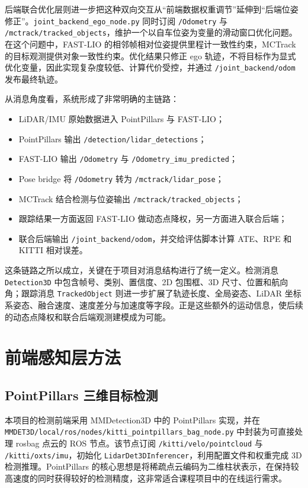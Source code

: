 \documentclass[UTF8,a4paper,12pt]{ctexart}
\begin{document}
后端联合优化层则进一步把这种双向交互从“前端数据权重调节”延伸到“后端位姿修正”。\texttt{joint\_backend\_ego\_node.py} 同时订阅 \texttt{/Odometry} 与 \texttt{/mctrack/tracked\_objects}，维护一个以自车位姿为变量的滑动窗口优化问题。在这个问题中，FAST-LIO 的相邻帧相对位姿提供里程计一致性约束，MCTrack 的目标观测提供对象一致性约束。优化结果只修正 ego 轨迹，不将目标作为显式优化变量，因此实现复杂度较低、计算代价受控，并通过 \texttt{/joint\_backend/odom} 发布最终轨迹。

从消息角度看，系统形成了非常明确的主链路：
\begin{itemize}
    \item LiDAR/IMU 原始数据进入 PointPillars 与 FAST-LIO；
    \item PointPillars 输出 \texttt{/detection/lidar\_detections}；
    \item FAST-LIO 输出 \texttt{/Odometry} 与 \texttt{/Odometry\_imu\_predicted}；
    \item Pose bridge 将 \texttt{/Odometry} 转为 \texttt{/mctrack/lidar\_pose}；
    \item MCTrack 结合检测与位姿输出 \texttt{/mctrack/tracked\_objects}；
    \item 跟踪结果一方面返回 FAST-LIO 做动态点降权，另一方面进入联合后端；
    \item 联合后端输出 \texttt{/joint\_backend/odom}，并交给评估脚本计算 ATE、RPE 和 KITTI 相对误差。
\end{itemize}

这条链路之所以成立，关键在于项目对消息结构进行了统一定义。检测消息 \texttt{Detection3D} 中包含帧号、类别、置信度、2D 包围框、3D 尺寸、位置和航向角；跟踪消息 \texttt{TrackedObject} 则进一步扩展了轨迹长度、全局姿态、LiDAR 坐标系姿态、融合速度、速度差分与加速度等字段。正是这些额外的运动信息，使后续的动态点降权和联合后端观测建模成为可能。

\section{前端感知层方法}
\subsection{PointPillars 三维目标检测}
本项目的检测前端采用 MMDetection3D 中的 PointPillars 实现，并在 \texttt{MMDET3D/local/ros/nodes/kitti\_pointpillars\_bag\_node.py} 中封装为可直接处理 rosbag 点云的 ROS 节点。该节点订阅 \texttt{/kitti/velo/pointcloud} 与 \texttt{/kitti/oxts/imu}，初始化 \texttt{LidarDet3DInferencer}，利用配置文件和权重完成 3D 检测推理。PointPillars 的核心思想是将稀疏点云编码为二维柱状表示，在保持较高速度的同时获得较好的检测精度，这非常适合课程项目中的在线运行需求。
\end{document}
